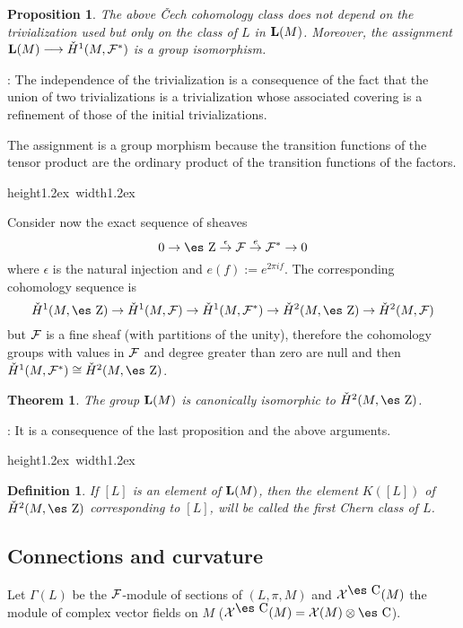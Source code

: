 \documentclass[12pt]{article}
\theoremstyle{plain}
\newtheorem{teor}{Theorem}
\newtheorem{prop}{Proposition}
\newtheorem{definition}{Definition}
\def\map#1{\mathrel{\mathop{\to}\limits^{#1}}}
\def\qed{\ifvmode\removelastskip\fi
{\unskip\nobreak\hfil\penalty50\hbox{}\nobreak\hfil
\hbox{\vrule height1.2ex width1.2ex}\parfillskip=0pt
\finalhyphendemerits=0 \par\smallskip}}
\def\Zahl{\mbox{\es Z}}
\def\Complex{\mbox{\es C}}
\begin{document}
\begin{prop}
The above \v{C}ech cohomology class
does not depend on the trivialization used
but only on the class of $L$ in ${\bf L}(M)$. Moreover, the assignment
${\bf L}(M) \longrightarrow \check{H}^1 (M,{\cal F}^*)$
is a group isomorphism.
\label{indep}
\end{prop}
: 
The independence of the trivialization
is a consequence of the fact that
the union of two trivializations is
a trivialization whose associated covering is
a refinement of those of the initial trivializations.

The assignment is a group morphism because
the transition functions of the tensor product
are the ordinary product of the transition functions
of the factors.
\qed

Consider now the exact sequence of sheaves
$$
0 \to \Zahl \map{\epsilon} {\cal F} \map{e} {\cal F}^* \to 0
$$
where $\epsilon$ is the natural injection and
$e(f):=e^{2\pi if}$.
The corresponding cohomology sequence is
$$
\check{H}^1(M,\Zahl ) \to
\check{H}^1(M,{\cal F}) \to
\check{H}^1(M,{\cal F}^*) \to
\check{H}^2(M,\Zahl) \to
\check{H}^2(M,{\cal F})
$$
but ${\cal F}$ is a fine sheaf
(with partitions of the unity),
therefore the cohomology groups with values in
${\cal F}$ and degree greater than zero are null and then
$\check{H}^1(M,{\cal F}^*) \cong  \check{H}^2(M,\Zahl)$.

\begin{teor}
The group ${\bf L}(M)$ is canonically isomorphic to $
\check{H}^2(M,\Zahl )$.
\label{cais}
\end{teor}
: 
It is a consequence of the last proposition and the above arguments.
\qed

\begin{definition}
If $[L]$ is an element of  ${\bf L}(M)$,
then the element $K([L])$ of $\check{H}^2(M,\Zahl)$
corresponding to $[L]$, will be called the
{\rm first Chern class} of $L$.
\label{chern}
\end{definition}


\subsection{Connections and curvature}


Let $\Gamma (L)$ be the ${\cal F}$-module of sections
of $(L,\pi ,M)$ and ${\cal X}^{\Complex}(M)$
the module of complex vector fields on $M$
(${\cal X}^{\Complex}(M) = {\cal X}(M) \otimes \Complex$).
\end{document}
